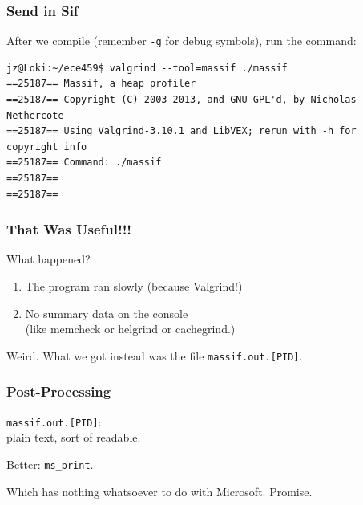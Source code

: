 \begin{frame}[fragile]
\frametitle{Send in Sif}

\Large
\begin{changemargin}{2cm}
After we compile (remember \texttt{-g} for debug symbols), run the command:
\end{changemargin}
\vspace*{-4em}
{\scriptsize
\begin{verbatim}
jz@Loki:~/ece459$ valgrind --tool=massif ./massif
==25187== Massif, a heap profiler
==25187== Copyright (C) 2003-2013, and GNU GPL'd, by Nicholas Nethercote
==25187== Using Valgrind-3.10.1 and LibVEX; rerun with -h for copyright info
==25187== Command: ./massif
==25187== 
==25187== 
\end{verbatim}
}

\end{frame}


\begin{frame}
\frametitle{That Was Useful!!!}

\large
\begin{changemargin}{2cm}
What happened? 

\begin{enumerate}
\item The program ran slowly (because Valgrind!)

\item No summary data on the console \\
\hspace*{2em} (like memcheck or helgrind or cachegrind.)
\end{enumerate}

Weird. What we got instead was the file \texttt{massif.out.[PID]}.
\end{changemargin}

\end{frame}


\begin{frame}
\frametitle{Post-Processing}

\Large
\begin{changemargin}{2cm}
\texttt{massif.out.[PID]}:\\
\hspace*{2cm} plain text, sort of readable.

Better: \texttt{ms\_print}.

Which has nothing whatsoever to do with Microsoft. Promise.
\end{changemargin}

\end{frame}


